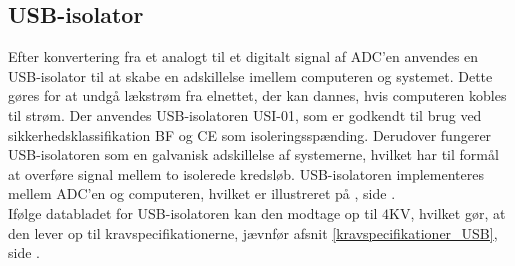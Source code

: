 \subsection{USB-isolator}\label{USB_afsnit}
Efter konvertering fra et analogt til et digitalt signal af ADC'en anvendes en USB-isolator til at skabe en adskillelse imellem computeren og systemet. Dette gøres for at undgå lækstrøm fra elnettet, der kan dannes, hvis computeren kobles til strøm. Der anvendes USB-isolatoren USI-01, som er godkendt til brug ved sikkerhedsklassifikation BF og CE som isoleringsspænding. Derudover fungerer USB-isolatoren som en galvanisk adskillelse af systemerne, hvilket har til formål at overføre signal mellem to isolerede kredsløb. USB-isolatoren implementeres mellem ADC'en og computeren, hvilket er illustreret på , side \pageref{kravblok}. \\
Ifølge databladet for USB-isolatoren kan den modtage op til $4$KV, hvilket gør, at den lever op til kravspecifikationerne, jævnfør afsnit \ref{kravspecifikationer_USB}, side \pageref{kravspecifikationer_USB}.
%
